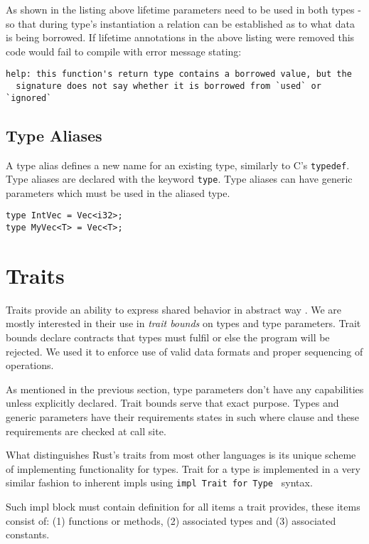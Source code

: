 As shown in the listing above lifetime parameters need to be used in both types - so that during type's instantiation
a relation can be established as to what data is being borrowed. If lifetime annotations in the above listing were removed
this code would fail to compile with error message stating:

\begin{verbatim}
help: this function's return type contains a borrowed value, but the 
  signature does not say whether it is borrowed from `used` or `ignored`
\end{verbatim}

\subsection{Type Aliases}

A type alias defines a new name for an existing type, similarly to C's \texttt{typedef}. Type aliases are declared with the keyword \texttt{type}.
Type aliases can have generic parameters which must be used in the aliased type.

\begin{lstlisting}
type IntVec = Vec<i32>;
type MyVec<T> = Vec<T>;
\end{lstlisting}

\section{Traits}

Traits provide an ability to express shared behavior in abstract way \cite{rustbook}. We are mostly interested in their use in \textit{trait bounds} on types and type parameters.
Trait bounds declare contracts that types must fulfil or else the program will be rejected. 
We used it to enforce use of valid data formats and proper sequencing of operations.

As mentioned in the previous section, type parameters don't have any capabilities unless explicitly declared. Trait bounds serve that exact purpose.
Types and generic parameters have their requirements states in such where clause and these requirements are checked at call site.

What distinguishes Rust's traits from most other languages is its unique scheme of implementing functionality for types.
Trait for a type is implemented in a very similar fashion to inherent impls using \texttt{impl Trait for Type } syntax.

Such impl block must contain definition for all items a trait provides, these items consist of: (1) functions or methods, (2) associated types and (3) associated constants. 

